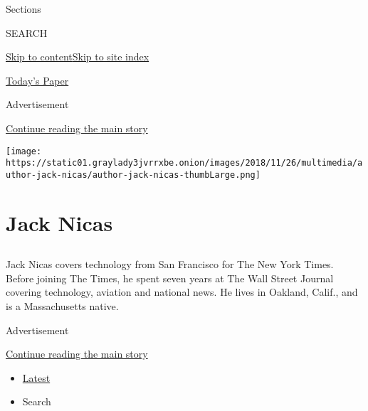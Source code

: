 Sections

SEARCH

\protect\hyperlink{site-content}{Skip to
content}\protect\hyperlink{site-index}{Skip to site index}

\href{https://myaccount.nytimes3xbfgragh.onion/auth/login?response_type=cookie\&client_id=vi}{}

\href{https://www.nytimes3xbfgragh.onion/section/todayspaper}{Today's
Paper}

Advertisement

\protect\hyperlink{after-top}{Continue reading the main story}

\texttt{[image: https://static01.graylady3jvrrxbe.onion/images/2018/11/26/multimedia/author-jack-nicas/author-jack-nicas-thumbLarge.png]}

\hypertarget{jack-nicas}{%
\section{Jack Nicas}\label{jack-nicas}}

\subsection{}

Jack Nicas covers technology from San Francisco for The New York Times.
Before joining The Times, he spent seven years at The Wall Street
Journal covering technology, aviation and national news. He lives in
Oakland, Calif., and is a Massachusetts native.

Advertisement

\protect\hyperlink{after-mid1}{Continue reading the main story}

\begin{itemize}
\tightlist
\item
  \protect\hyperlink{stream-panel}{Latest}
\item
  Search
\end{itemize}

